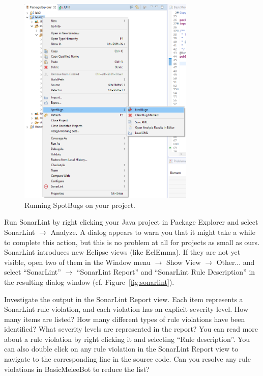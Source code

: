 \documentclass{scrreprt}
\begin{document}
\begin{figure}
\centering
\includegraphics[width=0.75\textwidth]{figures/SpotBugs.png}
\caption{Running SpotBugs on your project.}
\label{fig:spotbugs}
\end{figure}

Run SonarLint by right clicking your Java project in Package Explorer and select SonarLint $\rightarrow$ Analyze. A dialog appears to warn you that it might take a while to complete this action, but this is no problem at all for projects as small as ours. SonarLint introduces new Eclipse views (like EclEmma). If they are not yet visible, open two of them in the Window menu $\rightarrow$ Show View $\rightarrow$ Other... and select ``SonarLint'' $\rightarrow$ ``SonarLint Report'' and ``SonarLint Rule Description'' in the resulting dialog window (cf. Figure~\ref{fig:sonarlint}). 

Investigate the output in the SonarLint Report view. Each item represents a SonarLint rule violation, and each violation has an explicit severity level. How many items are listed? How many different types of rule violations have been identified? What severity levels are represented in the report? You can read more about a rule violation by right clicking it and selecting ``Rule description''. You can also double click on any rule violation in the SonarLint Report view to navigate to the corresponding line in the source code. Can you resolve any rule violations in BasicMeleeBot to reduce the list?
\end{document}
